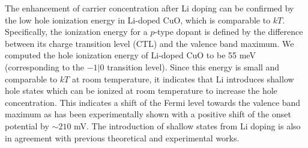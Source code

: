 The enhancement of carrier concentration after Li doping can be confirmed by the low hole ionization energy in Li-doped CuO, which is comparable to $kT$. Specifically, the ionization energy for a $p$-type dopant is defined by the difference between its charge transition level (CTL) and the valence band maximum.
We computed the hole ionization energy of Li-doped CuO to be 55 meV (corresponding to the $-1|0$ transition level). Since this energy is small and comparable to $kT$ at room temperature, it indicates that Li introduces shallow hole states which can be ionized at room temperature to increase the hole concentration. This indicates a shift of the Fermi level towards the valence band maximum as has been experimentally shown with a positive shift of the onset potential by $\sim 210$ mV. The introduction of shallow states from Li doping is also in agreement with previous theoretical and experimental works.\cite{zheng2004fast,choi2017p}

